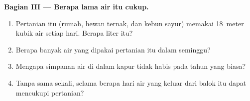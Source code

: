 \begin{problem}
\medskip
\noindent\textbf{Bagian III --- Berapa lama air itu cukup.}
\begin{enumerate}[resume]
  \item Pertanian itu (rumah, hewan ternak, dan kebun sayur) memakai
        18~meter kubik air setiap hari. Berapa liter itu?
  \item Berapa banyak air yang dipakai pertanian itu dalam seminggu?
  \item Mengapa simpanan air di dalam kapur tidak habis pada tahun yang
        biasa?
  \item Tanpa  sama sekali, selama berapa hari air yang keluar dari
        balok itu dapat mencukupi pertanian?
\end{enumerate}
\end{problem}
